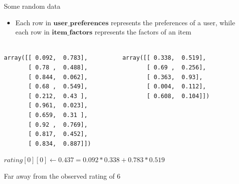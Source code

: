 \documentclass[obeyspaces]{beamer}
\providecommand{\tightlist}{%
  \setlength{\itemsep}{0pt}\setlength{\parskip}{0pt}}
\newcommand{\vect}[1]{\boldsymbol{#1}} %
\begin{document}
\begin{frame}{Some random data}

\begin{itemize}
\tightlist
\item
  Each row in \(\vect{user\_preferences}\) represents the preferences of
  a user, while each row in \(\vect{item\_factors}\) represents the
  factors of an item
\end{itemize}

\begin{Verbatim}[fontsize=\scriptsize]

array([[ 0.092,  0.783],          array([[ 0.338,  0.519],   
       [ 0.78 ,  0.488],                 [ 0.69 ,  0.256],
       [ 0.844,  0.062],                 [ 0.363,  0.93],            
       [ 0.68 ,  0.549],                 [ 0.004,  0.112],       
       [ 0.212,  0.43 ],                 [ 0.608,  0.104]])  
       [ 0.961,  0.023],
       [ 0.659,  0.31 ],
       [ 0.92 ,  0.769],
       [ 0.817,  0.452],
       [ 0.834,  0.887]])

\end{Verbatim}

\(rating[0][0] \gets 0.437 = 0.092 * 0.338 + 0.783* 0.519\)

Far away from the observed rating of \(6\)

\end{frame}
\end{document}
